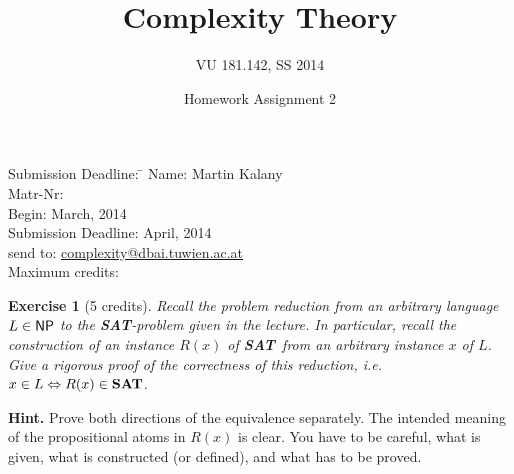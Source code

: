 \documentclass [11pt]{article}
\title{Complexity Theory}
\author{VU 181.142, SS 2014}
\date{Homework Assignment 2}
\newtheorem{exercise}[theorem]{Exercise}
\newcommand{\LR}{\Leftrightarrow}
\newcommand{\ccfont}[1]{\protect\mathsf{#1}}
\newcommand{\NP}{\ccfont{NP}}
\newcommand{\SAT}{\mbox{\bf SAT}}
\begin{document}
\maketitle

\begin{tabbing}
Submission Deadline: \quad \= \kill
Name: \> Martin Kalany \\
Matr-Nr:  \\
Begin:  March, 2014  \\
Submission Deadline:  April, 2014 \\
send to: \> \url{complexity@dbai.tuwien.ac.at}\\
Maximum credits:  
\end{tabbing}

\medskip

\noindent
\begin{exercise}[5 credits]
{\em Recall the problem reduction from an arbitrary language $L \in \NP$ 
to the \SAT-problem given in the lecture. 
In particular, recall the construction of an instance $R(x)$ of
\SAT\ from an arbitrary instance $x$ of $L$.
Give a rigorous proof of the correctness of this reduction, i.e.
$x \in L \LR R(x) \in \SAT$.
} %
\end{exercise}


\noindent
{\bf Hint.} Prove both directions of the equivalence separately. 
The intended meaning of
the propositional atoms in $R(x)$ is clear. You have to be careful, what is given, what is constructed (or defined), and what has to be proved. 
\end{document}

